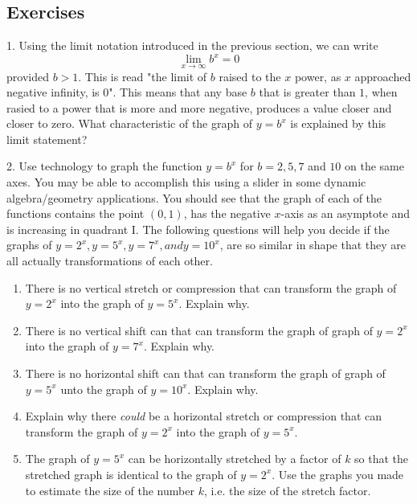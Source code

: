 \documentclass[10pt,]{book}
\theoremstyle{plain}
\theoremstyle{definition}
\theoremstyle{definition}
\theoremstyle{definition}
\numberwithin{equation}{section}
\newcommand{\gt}{>}
\begin{document}
\subsection[{Exercises}]{Exercises}\label{exercises-9}
\begin{exerciselist}
\item[1.]\hypertarget{exercise-60}{}\hypertarget{p-256}{}%
Using the limit notation introduced in the previous section, we can write%
\begin{equation*}
\lim_{x \to \infty} b^x = 0
\end{equation*}
provided \(b \gt 1\). This is read "the limit of \(b\) raised to the \(x\) power, as \(x\) approached negative infinity, is \(0\)". This means that any base \(b\) that is greater than \(1\), when rasied to a power that is more and more negative, produces a value closer and closer to zero. What characteristic of the graph of \(y=b^x\) is explained by this limit statement?%
\par\smallskip
\item[2.]\hypertarget{exercise-61}{}\hypertarget{p-257}{}%
Use technology to graph the function  \(y=b^x\) for \(b = 2, 5, 7\) and \(10\) on the same axes. You may be able to accomplish this using a slider in some dynamic algebra/geometry applications. You should see that the graph of each of the functions contains the point \((0,1)\), has the negative \(x\)-axis as an asymptote and is increasing in quadrant I. The following questions will help you decide if the graphs of \(y=2^x, y=5^x, y=7^x,and y=10^x\), are so similar in shape that they are all actually transformations of each other.%
\leavevmode%
\begin{enumerate}[label=(\alph*)]
\item\hypertarget{li-116}{}There is no vertical stretch or compression that can transform the graph of \(y=2^x\) into the graph of \(y=5^x\).  Explain why.%
\item\hypertarget{li-117}{}There is no vertical shift can that can transform the graph of graph of \(y=2^x\) into the graph of \(y=7^x\). Explain why.%
\item\hypertarget{li-118}{}There is no horizontal shift can that can transform the graph of graph of \(y=5^x\) unto the graph of \(y=10^x\). Explain why.%
\item\hypertarget{li-119}{}Explain why there \emph{could} be a horizontal stretch or compression that can transform the graph of \(y=2^x\) into the graph of \(y=5^x\).%
\item\hypertarget{li-120}{}The graph of \(y=5^x\) can be horizontally stretched by a factor of \(k\) so that the stretched graph is identical to the graph of \(y=2^x\). Use the graphs you made to estimate the size of the number \(k\), i.e. the size of the stretch factor.%
\end{enumerate}
\par\smallskip
\end{exerciselist}
\typeout{************************************************}
\typeout{************************************************}
\end{document}
